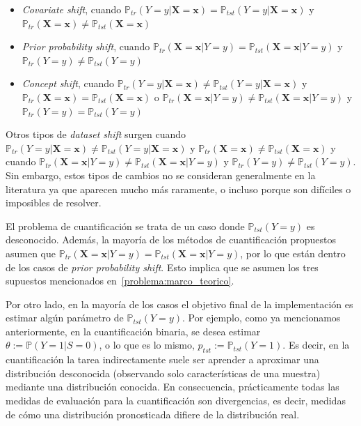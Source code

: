 \begin{itemize}[noitemsep]
    \item {\it Covariate shift}, cuando
    $\mathbb{P}_{tr}(Y=y|\boldsymbol{X}=\boldsymbol{x}) =
    \mathbb{P}_{tst}(Y=y|\boldsymbol{X}=\boldsymbol{x})$ y
    $\mathbb{P}_{tr}(\boldsymbol{X}=\boldsymbol{x}) \neq
    \mathbb{P}_{tst}(\boldsymbol{X}=\boldsymbol{x})$
    \item {\it Prior probability shift}, cuando
    $\mathbb{P}_{tr}(\boldsymbol{X}=\boldsymbol{x}|Y=y) =
    \mathbb{P}_{tst}(\boldsymbol{X}=\boldsymbol{x}|Y=y)$ y $\mathbb{P}_{tr}(Y=y)
    \neq \mathbb{P}_{tst}(Y=y)$
    \item {\it Concept shift}, cuando
    $\mathbb{P}_{tr}(Y=y|\boldsymbol{X}=\boldsymbol{x}) \neq
    \mathbb{P}_{tst}(Y=y|\boldsymbol{X}=\boldsymbol{x})$ y
    $\mathbb{P}_{tr}(\boldsymbol{X}=\boldsymbol{x}) =
    \mathbb{P}_{tst}(\boldsymbol{X}=\boldsymbol{x})$ o
    $\mathbb{P}_{tr}(\boldsymbol{X}=\boldsymbol{x}|Y=y) \neq
    \mathbb{P}_{tst}(\boldsymbol{X}=\boldsymbol{x}|Y=y)$ y $\mathbb{P}_{tr}(Y=y)
    = \mathbb{P}_{tst}(Y=y)$
\end{itemize}

\vspace{\baselineskip}

Otros tipos de {\it dataset shift\/} surgen cuando
$\mathbb{P}_{tr}(Y=y|\boldsymbol{X}=\boldsymbol{x}) \neq
\mathbb{P}_{tst}(Y=y|\boldsymbol{X}=\boldsymbol{x})$ y
$\mathbb{P}_{tr}(\boldsymbol{X}=\boldsymbol{x}) \neq
\mathbb{P}_{tst}(\boldsymbol{X}=\boldsymbol{x})$ y cuando
$\mathbb{P}_{tr}(\boldsymbol{X}=\boldsymbol{x}|Y=y) \neq
\mathbb{P}_{tst}(\boldsymbol{X}=\boldsymbol{x}|Y=y)$ y $\mathbb{P}_{tr}(Y=y)
\neq \mathbb{P}_{tst}(Y=y)$. Sin embargo, estos tipos de cambios no se
consideran generalmente en la literatura ya que aparecen mucho más raramente, o
incluso porque son difíciles o imposibles de resolver.

El problema de cuantificación se trata de un caso donde $\mathbb{P}_{tst}(Y=y)$
es desconocido. Además, la mayoría de los métodos de cuantificación propuestos
asumen que $\mathbb{P}_{tr}(\boldsymbol{X}=\boldsymbol{x}|Y=y) =
\mathbb{P}_{tst}(\boldsymbol{X}=\boldsymbol{x}|Y=y)$, por lo que están dentro de
los casos de {\it prior probability shift}. Esto implica que se asumen los tres
supuestos mencionados en~\ref{problema:marco_teorico}.

Por otro lado, en la mayoría de los casos el objetivo final de la implementación
es estimar algún parámetro de $\mathbb{P}_{tst}(Y=y)$. Por ejemplo, como ya
mencionamos anteriormente, en la cuantificación binaria, se desea estimar
$\theta:= \mathbb{P}(Y=1|S=0)$, o lo que es lo mismo, $p_{tst}:=
\mathbb{P}_{tst}(Y=1)$. Es decir, en la cuantificación la tarea indirectamente
suele ser aprender a aproximar una distribución desconocida (observando solo
características de una muestra) mediante una distribución conocida. En
consecuencia, prácticamente todas las medidas de evaluación para la
cuantificación son divergencias, es decir, medidas de cómo una distribución
pronosticada difiere de la distribución real.


